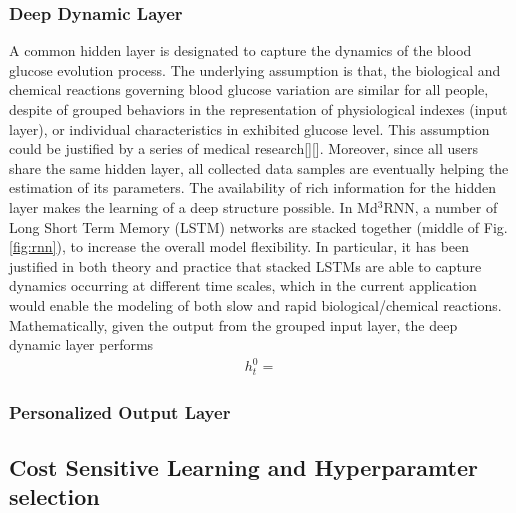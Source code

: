 \subsubsection{Deep Dynamic Layer}
A common hidden layer is designated to capture the dynamics of the blood glucose evolution process. The underlying assumption is that, the biological and chemical reactions governing blood glucose variation are similar for all people, despite of grouped behaviors in the representation of physiological indexes (input layer), or individual characteristics in exhibited glucose level. This assumption could be justified by a series of medical research[][]. Moreover, since all users share the same hidden layer, all collected data samples are eventually helping the estimation of its parameters. The availability of rich information for the hidden layer makes the learning of a deep structure possible. In Md$^3$RNN, a number of Long Short Term Memory (LSTM) networks are stacked together (middle of Fig.\ref{fig:rnn}), to increase the overall model flexibility. In particular, it has been justified in both theory and practice that stacked LSTMs are able to capture dynamics occurring at different time scales, which in the current application would enable the modeling of both slow and rapid biological/chemical reactions. Mathematically, given the output from the grouped input layer, the deep dynamic layer performs
\begin{align}
h^0_t=
\end{align}



\subsubsection{Personalized Output Layer}


\subsection{Cost Sensitive Learning and Hyperparamter selection}